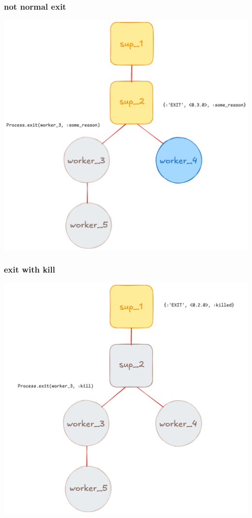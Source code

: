 \documentclass[10pt]{beamer}
\begin{document}
\begin{frame}
  \frametitle{not normal exit}
  \center
  \includegraphics[scale=0.2]{link_exit_3}
\end{frame}

\begin{frame}
  \frametitle{exit with kill}
  \center
  \includegraphics[scale=0.2]{link_exit_4}
\end{frame}
\end{document}
